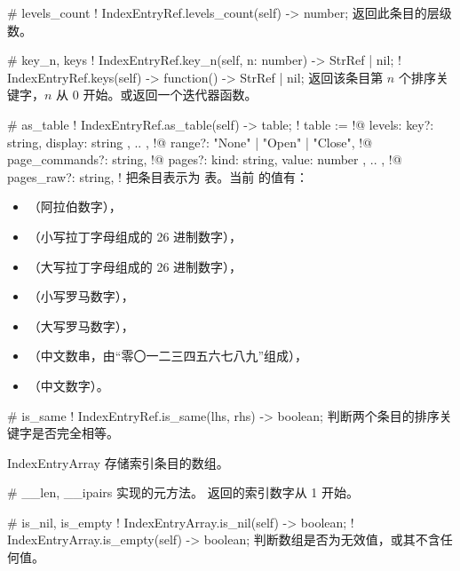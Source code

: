\documentclass[class=article,doc={kv-usage}]{cusdoc}
\newcommand*\LUA{\texorpdfstring{\textcon{lua}}{lua}}
\begin{document}
\begin{luadoc*}{}
# levels_count
! IndexEntryRef.levels_count(self) -> number;
返回此条目的层级数。
\end{luadoc*}

\begin{luadoc*}{}
# key_n, keys
! IndexEntryRef.key_n(self, n: number) -> StrRef | nil;
! IndexEntryRef.keys(self) -> function() -> StrRef | nil;
返回该条目第 $n$ 个排序关键字，$n$ 从 0 开始。或返回一个迭代器函数。
\end{luadoc*}

\begin{luadoc*}{}
# as_table
! IndexEntryRef.as_table(self) -> table;
! table := {
!@  levels: { { key?: string, display: string }, .. },
!@  range?: "None" | "Open" | "Close",
!@  page_commands?: string,
!@  pages?: { { kind: string, value: number }, .. },
!@  pages_raw?: string,
! }
把条目表示为 \LUA 表。当前  的值有：
\begin{itemize}
  \item{}（阿拉伯数字），
  \item{}（小写拉丁字母组成的 26 进制数字），
  \item{}（大写拉丁字母组成的 26 进制数字），
  \item{}（小写罗马数字），
  \item{}（大写罗马数字），
  \item{}（中文数串，由“零〇一二三四五六七八九”组成），
  \item{}（中文数字）。
\end{itemize}
\end{luadoc*}

\begin{luadoc*}{}
# is_same
! IndexEntryRef.is_same(lhs, rhs) -> boolean;
判断两个条目的排序关键字是否完全相等。
\end{luadoc*}

\begin{luadoc}[global]{IndexEntryArray}
存储索引条目的数组。
\end{luadoc}

\begin{luadoc*}{}
# __len, __ipairs
 实现的元方法。 返回的索引数字从 1 开始。
\end{luadoc*}

\begin{luadoc*}{}
# is_nil, is_empty
! IndexEntryArray.is_nil(self) -> boolean;
! IndexEntryArray.is_empty(self) -> boolean;
判断数组是否为无效值，或其不含任何值。
\end{luadoc*}
\end{document}
